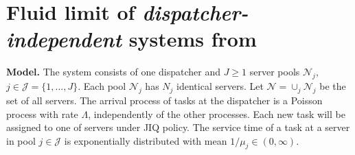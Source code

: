 \documentclass[11pt, reqno]{article}
\numberwithin{equation}{section}
\numberwithin{theorem}{section}
\begin{document}







\appendix

\section{Fluid limit of \textit{dispatcher-independent} systems from~\cite{AS15}}\label{AS15}

\noindent
\textbf{Model.} The system consists of one dispatcher and $J\geq 1$ server pools $\mathcal{N}_j$, $j\in \mathcal{J}=\{1,...,J\}$. Each pool $\mathcal{N}_j$ has $N_j$ identical servers. Let $\mathcal{N}=\cup_{j}\mathcal{N}_j$ be the set of all servers. The arrival process of tasks at the dispatcher is a Poisson process with rate $\Lambda$, independently of the other processes. Each new task will be assigned to one of servers under JIQ policy. The service time of a task at a server in pool $j\in\mathcal{J}$ is exponentially distributed with mean $1/\mu_j\in(0,\infty)$. 
\vspace{3mm}
\end{document}
